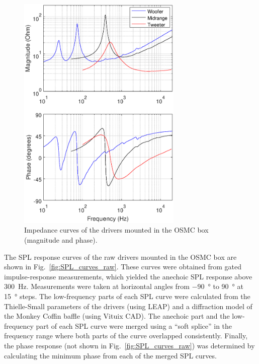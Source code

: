 \documentclass[12pt,a4paper]{article}
\providecommand{\figr}[1]{Fig.~\ref{fig:#1}}
\providecommand{\figlabel}[1]{\label{fig:#1}}
\begin{document}
\begin{figure}[tbp]
	\centering
	\includegraphics[width=0.7\textwidth]{impedance_curves_drivers.eps}
	\caption{Impedance curves of the drivers mounted in the OSMC box (magnitude and phase).}
	\figlabel{impedance_curves_drivers}
\end{figure}



The SPL response curves of the raw drivers mounted in the OSMC box\cite{osmc_p568,osmc_p576} are shown in \figr{SPL_curves_raw}. These curves were obtained from gated impulse-response measurements, which yielded the anechoic SPL response above \SI{300}{Hz}. Measurements were taken at horizontal angles from \SI{-90}{\degree} to \SI{+90}{\degree} at \SI{15}{\degree} steps. The low-frequency parts of each SPL curve were calculated from the Thielle-Small parameters of the drivers (using LEAP)\cite{osmc_p511} and a diffraction model of the Monkey Coffin baffle (using Vituix CAD)\cite{osmc_p555}. The anechoic part and the low-frequency part of each SPL curve were merged using a ``soft splice'' in the frequency range where both parts of the curve overlapped consistently\cite{osmc_p568}. Finally, the phase response (not shown in \figr{SPL_curves_raw}) was determined by calculating the minimum phase from each of the merged SPL curves.%
\end{document}

